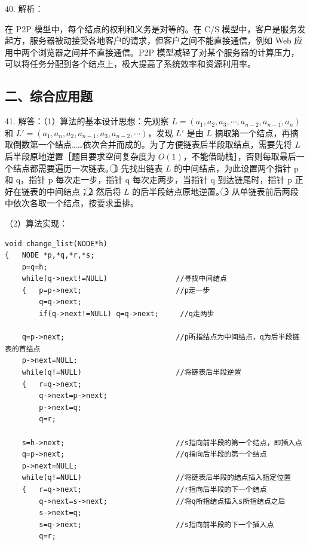 \documentclass[UTF8,11pt]{ctexart}
\begin{document}
40. 解析：


在 P2P 模型中，每个结点的权利和义务是对等的。在 C/S 模型中，客户是服务发起方，服务器被动接受各地客户的请求，但客户之间不能直接通信，例如 Web 应用中两个浏览器之间并不直接通信。P2P 模型减轻了对某个服务器的计算压力，可以将任务分配到各个结点上，极大提高了系统效率和资源利用率。


\subsection*{二、综合应用题}

41. 解答：（1）算法的基本设计思想：先观察 \(\displaystyle L=(a_1,\allowbreak a_2,\allowbreak a_3,\allowbreak \cdots,\allowbreak a_{n-2},\allowbreak a_{n-1},\allowbreak a_n)\) 和 \(\displaystyle L'=(a_1,\allowbreak a_n,\allowbreak a_2,\allowbreak a_{n-1},\allowbreak a_3,\allowbreak a_{n-2},\allowbreak \cdots)\)，发现 \(\displaystyle L'\) 是由 \(\displaystyle L\) 摘取第一个结点，再摘取倒数第一个结点……依次合并而成的。为了方便链表后半段取结点，需要先将 \(\displaystyle L\) 后半段原地逆置［题目要求空间复杂度为 \(\displaystyle O(1)\)，不能借助栈］，否则每取最后一个结点都需要遍历一次链表。\textcircled{1} 先找出链表 \(\displaystyle L\) 的中间结点，为此设置两个指针 p 和 q，指针 p 每次走一步，指针 q 每次走两步，当指针 q 到达链尾时，指针 p 正好在链表的中间结点；\textcircled{2} 然后将 \(\displaystyle L\) 的后半段结点原地逆置。\textcircled{3} 从单链表前后两段中依次各取一个结点，按要求重排。


（2）算法实现：


\begin{Verbatim}[breaklines,breakanywhere,fontsize=\small]
void change_list(NODE*h)
{   NODE *p,*q,*r,*s;
    p=q=h;
    while(q->next!=NULL)                //寻找中间结点
    {   p=p->next;                      //p走一步
        q=q->next;
        if(q->next!=NULL) q=q->next;     //q走两步

    q=p->next;                          //p所指结点为中间结点，q为后半段链表的首结点
    p->next=NULL;
    while(q!=NULL)                      //将链表后半段逆置
    {   r=q->next;
        q->next=p->next;
        p->next=q;
        q=r;

    s=h->next;                          //s指向前半段的第一个结点，即插入点
    q=p->next;                          //q指向后半段的第一个结点
    p->next=NULL;
    while(q!=NULL)                      //将链表后半段的结点插入指定位置
    {   r=q->next;                      //r指向后半段的下一个结点
        q->next=s->next;                //将q所指结点插入s所指结点之后
        s->next=q;
        s=q->next;                      //s指向前半段的下一个插入点
        q=r;
\end{Verbatim}
\end{document}
